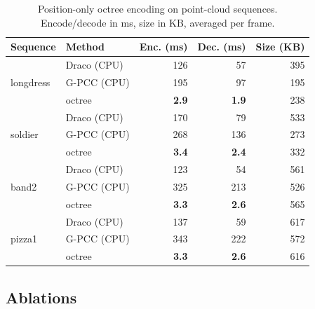 \begin{table}[t]
  \centering
  {
  \begin{tabular}{l|l|rr|r}
    \hline
    \textbf{Sequence} & \textbf{Method} & \textbf{Enc. (ms)} & \textbf{Dec. (ms)} & \textbf{Size (KB)} \\
    \hline\hline
    \multirow{3}{*}{longdress}
      & Draco (CPU)       & 126  & 57  & 395 \\
      & G-PCC (CPU)        & 195  & 97  & 195 \\
      & \gsnfs{} octree & \textbf{2.9}  & \textbf{1.9} & 238 \\
    \hline
    \multirow{3}{*}{soldier}
      & Draco (CPU)       & 170  & 79  & 533 \\
      & G-PCC (CPU)        & 268  & 136 & 273 \\
      & \gsnfs{} octree & \textbf{3.4}  & \textbf{2.4} & 332 \\
    \hline
    \multirow{3}{*}{band2}
      & Draco (CPU)       & 123  & 54  & 561 \\
      & G-PCC (CPU)        & 325  & 213 & 526 \\
      & \gsnfs{} octree & \textbf{3.3}  & \textbf{2.6} & 565 \\
    \hline
    \multirow{3}{*}{pizza1}
      & Draco (CPU)       & 137  & 59  & 617 \\
      & G-PCC (CPU)        & 343  & 222 & 572 \\
      & \gsnfs{} octree & \textbf{3.3}  & \textbf{2.6} & 616 \\
    \hline
  \end{tabular}
  }
  \caption{Position-only octree encoding on point-cloud sequences. Encode/decode in ms, size in KB, averaged per frame.}
  \label{tab:ptcl-octree}
\end{table}

\subsection{Ablations}\label{sec:ablations}

%


